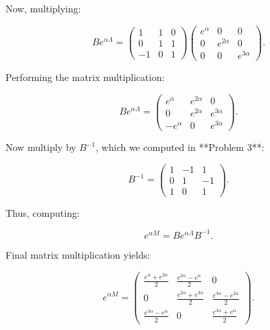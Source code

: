 \documentclass[12pt]{article}
\begin{document}
Now, multiplying:

\[
B e^{\alpha \Lambda} =
\begin{pmatrix}
1 & 1 & 0 \\
0 & 1 & 1 \\
-1 & 0 & 1
\end{pmatrix}
\begin{pmatrix}
e^{\alpha} & 0 & 0 \\
0 & e^{2\alpha} & 0 \\
0 & 0 & e^{3\alpha}
\end{pmatrix}.
\]

Performing the matrix multiplication:

\[
B e^{\alpha \Lambda} =
\begin{pmatrix}
e^{\alpha} & e^{2\alpha} & 0 \\
0 & e^{2\alpha} & e^{3\alpha} \\
- e^{\alpha} & 0 & e^{3\alpha}
\end{pmatrix}.
\]

Now multiply by \( B^{-1} \), which we computed in **Problem 3**:

\[
B^{-1} =
\begin{pmatrix}
1 & -1 & 1 \\
0 & 1 & -1 \\
1 & 0 & 1
\end{pmatrix}.
\]

Thus, computing:

\[
e^{\alpha M} = B e^{\alpha \Lambda} B^{-1}.
\]

Final matrix multiplication yields:

\[
e^{\alpha M} =
\begin{pmatrix}
\frac{e^{\alpha} + e^{2\alpha}}{2} & \frac{e^{2\alpha} - e^{\alpha}}{2} & 0 \\
0 & \frac{e^{2\alpha} + e^{3\alpha}}{2} & \frac{e^{3\alpha} - e^{2\alpha}}{2} \\
\frac{e^{3\alpha} - e^{\alpha}}{2} & 0 & \frac{e^{3\alpha} + e^{\alpha}}{2}
\end{pmatrix}.
\]
\end{document}
